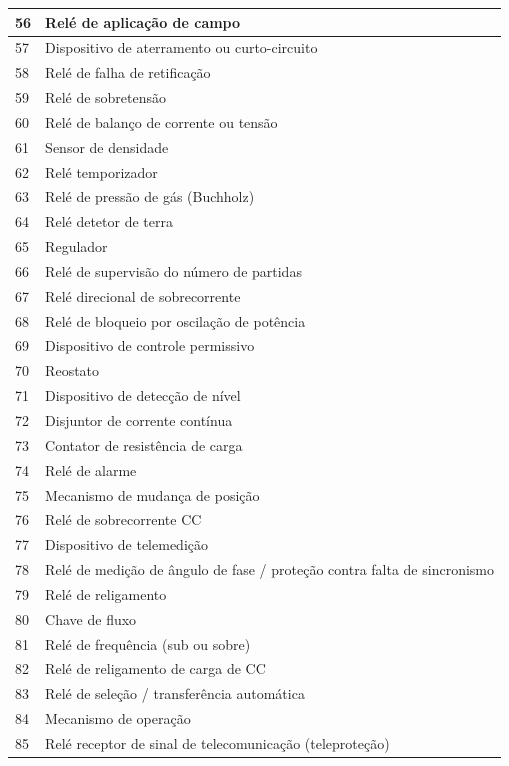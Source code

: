 \documentclass[a5paper,english,spanish,brazil]{ufsc-thesis}
\begin{document}
\begin{longtable}{|l|p{}|}
		  56 & Relé de aplicação de campo \\ \hline
		  57 & Dispositivo de aterramento ou curto-circuito \\ \hline
		  58 & Relé de falha de retificação \\ \hline
		  59 & Relé de sobretensão \\ \hline
		  60 & Relé de balanço de corrente ou tensão \\ \hline
		  61 & Sensor de densidade \\ \hline
		  62 & Relé temporizador \\ \hline
		  63 & Relé de pressão de gás (Buchholz) \\ \hline
		  64 & Relé detetor de terra \\ \hline
		  65 & Regulador \\ \hline
		  66 & Relé de supervisão do número de partidas  \\ \hline
		  67 & Relé direcional de sobrecorrente  \\ \hline
		  68 & Relé de bloqueio por oscilação de potência \\ \hline
		  69 & Dispositivo de controle permissivo \\ \hline
		  70 & Reostato  \\ \hline
		  71 & Dispositivo de detecção de nível \\ \hline
		  72 & Disjuntor de corrente contínua \\ \hline
		  73 & Contator de resistência de carga \\ \hline
		  74 & Relé de alarme \\ \hline
		  75 & Mecanismo de mudança de posição \\ \hline
		  76 & Relé de sobrecorrente CC \\ \hline
		  77 & Dispositivo de telemedição \\ \hline
		  78 & Relé de medição de ângulo de fase / proteção contra falta de sincronismo \\ \hline
		  79 & Relé de religamento \\ \hline
		  80 & Chave de fluxo \\ \hline
		  81 & Relé de frequência (sub ou sobre) \\ \hline
		  82 & Relé de religamento de carga de CC \\ \hline
		  83 & Relé de seleção / transferência automática \\ \hline
		  84 & Mecanismo de operação \\ \hline
		  85 & Relé receptor de sinal de telecomunicação (teleproteção) \\ \hline

\end{longtable}
\end{document}
